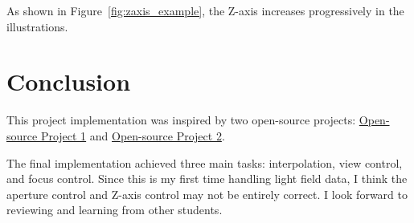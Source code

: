 \documentclass{article}
\begin{document}
As shown in Figure~\ref{fig:zaxis_example}, the Z-axis increases progressively in the illustrations.



\section{Conclusion}
This project implementation was inspired by two open-source projects: 
\href{https://github.com/chiped/LightFieldRenderer}{Open-source Project 1} and 
\href{https://github.com/TachikakaMin/Light_Field_Refocusing}{Open-source Project 2}.

The final implementation achieved three main tasks: interpolation, view control, and focus control. Since this is my first time handling light field data, I think the aperture control and Z-axis control may not be entirely correct. I look forward to reviewing and learning from other students.
\end{document}
